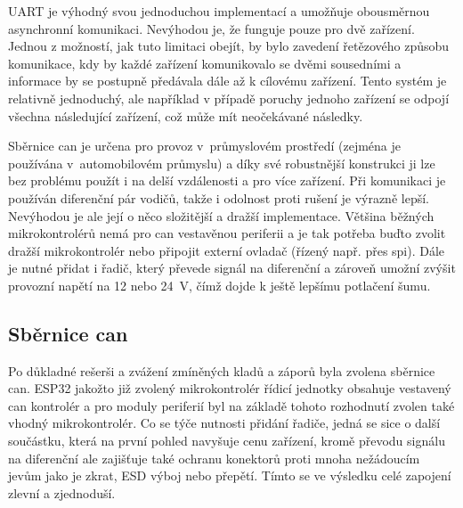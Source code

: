         UART je výhodný svou jednoduchou implementací a umožňuje obousměrnou asynchronní komunikaci. Nevýhodou je, že funguje pouze pro dvě zařízení. Jednou z možností, jak tuto limitaci obejít, by bylo zavedení řetězového způsobu komunikace, kdy by každé zařízení komunikovalo se dvěmi sousedními a informace by se postupně předávala dále až k cílovému zařízení. Tento systém je relativně jednoduchý, ale například v případě poruchy jednoho zařízení se odpojí všechna následující zařízení, což může mít neočekávané následky.

        Sběrnice \acs{can} je určena pro provoz v~průmyslovém prostředí (zejména je používána v~automobilovém průmyslu) a díky své robustnější konstrukci ji lze bez problému použít i na delší vzdálenosti a pro více zařízení. Při komunikaci je používán diferenční pár vodičů, takže i odolnost proti rušení je výrazně lepší. Nevýhodou je ale její o něco složitější a dražší implementace. Většina běžných mikrokontrolérů nemá pro \acs{can} vestavěnou periferii a je tak potřeba buďto zvolit dražší mikrokontrolér nebo připojit externí ovladač (řízený např. přes \acs{spi}). Dále je nutné přidat i řadič, který převede signál na diferenční a zároveň umožní zvýšit provozní napětí na 12  nebo \qty{24}{V}, čímž dojde k ještě lepšímu potlačení šumu.

    \subsection{Sběrnice \acs{can}}
        Po důkladné rešerši a zvážení zmíněných kladů a záporů byla  zvolena sběrnice \acs{can}. ESP32 jakožto již zvolený mikrokontrolér řídicí jednotky obsahuje vestavený \acs{can} kontrolér a pro moduly periferií byl na základě tohoto rozhodnutí zvolen také vhodný mikrokontrolér. Co se týče nutnosti přidání řadiče, jedná se sice o další součástku, která na první pohled navyšuje cenu zařízení, kromě převodu signálu na diferenční ale zajišťuje také ochranu konektorů proti mnoha nežádoucím jevům jako je zkrat, ESD výboj nebo přepětí. Tímto se ve výsledku celé zapojení zlevní a zjednoduší.


   

